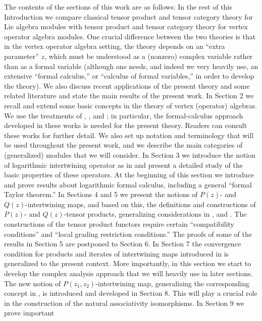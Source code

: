 \documentclass[12pt]{article}
\begin{document}
The contents of the sections of this work are as follows: In the rest
of this Introduction we compare classical tensor product and tensor
category theory for Lie algebra modules with tensor product and tensor
category theory for vertex operator algebra modules.  One crucial
difference between the two theories is that in the vertex operator
algebra setting, the theory depends on an ``extra parameter'' $z$,
which must be understood as a (nonzero) complex variable rather than
as a formal variable (although one needs, and indeed we very heavily
use, an extensive ``formal calculus,'' or ``calculus of formal
variables,'' in order to develop the theory).  We also discuss recent
applications of the present theory and some related literature and state 
the main results of the present work.  In
Section 2 we recall and extend some basic concepts in the theory of
vertex (operator) algebras.  We use the treatments of \cite{FLM2},
\cite{FHL}, \cite{DL} and \cite{LL}; in particular, the
formal-calculus approach developed in these works is needed for the
present theory.  Readers can consult these works for further detail.
We also set up notation and terminology that will be used throughout
the present work, and we describe the main categories of (generalized)
modules that we will consider. In Section 3 we introduce the notion of
logarithmic intertwining operator as in \cite{Mi} and present a
detailed study of the basic properties of these operators.  At the
beginning of this section we introduce and prove results about
logarithmic formal calculus, including a general ``formal Taylor
theorem.''  In Sections 4 and 5 we present the notions of $P(z)$- and
$Q(z)$-intertwining maps, and based on this, the definitions and
constructions of $P(z)$- and $Q(z)$-tensor products, generalizing
considerations in \cite{tensor1}, \cite{tensor2} and \cite{tensor3}.
The constructions of the tensor product functors require certain
``compatibility conditions'' and ``local grading restriction
conditions.''  The proofs of some of the results in Section 5 are
postponed to Section 6.  In Section 7 the convergence condition for
products and iterates of intertwining maps introduced in
\cite{tensor4} is generalized to the present context.  More
importantly, in this section we start to develop the complex analysis
approach that we will heavily use in later sections.  The new notion
of $P(z_1,z_2)$-intertwining map, generalizing the corresponding
concept in \cite{tensor4}, is introduced and developed in Section 8.
This will play a crucial role in the construction of the natural
associativity isomorphisms.  In Section 9 we prove important
\end{document}
